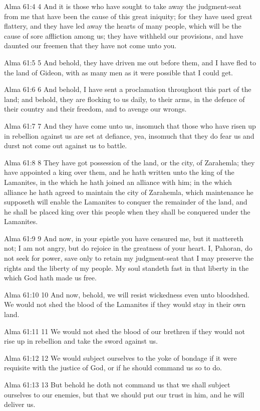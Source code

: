 Alma 61:4
 4 And it is those who have sought to take away the judgment-seat
from me that have been the cause of this great iniquity; for they
have used great flattery, and they have led away the hearts of
many people, which will be the cause of sore affliction among us;
they have withheld our provisions, and have daunted our freemen
that they have not come unto you.

Alma 61:5
 5 And behold, they have driven me out before them, and I have
fled to the land of Gideon, with as many men as it were possible
that I could get.

Alma 61:6
 6 And behold, I have sent a proclamation throughout this part of
the land; and behold, they are flocking to us daily, to their
arms, in the defence of their country and their freedom, and to
avenge our wrongs.

Alma 61:7
 7 And they have come unto us, insomuch that those who have risen
up in rebellion against us are set at defiance, yea, insomuch
that they do fear us and durst not come out against us to battle.

Alma 61:8
 8 They have got possession of the land, or the city, of
Zarahemla; they have appointed a king over them, and he hath
written unto the king of the Lamanites, in the which he hath
joined an alliance with him; in the which alliance he hath agreed
to maintain the city of Zarahemla, which maintenance he supposeth
will enable the Lamanites to conquer the remainder of the land,
and he shall be placed king over this people when they shall be
conquered under the Lamanites.

Alma 61:9
 9 And now, in your epistle you have censured me, but it
mattereth not; I am not angry, but do rejoice in the greatness of
your heart. I, Pahoran, do not seek for power, save only to
retain my judgment-seat that I may preserve the rights and the
liberty of my people. My soul standeth fast in that liberty in
the which God hath made us free.

Alma 61:10
 10 And now, behold, we will resist wickedness even unto
bloodshed. We would not shed the blood of the Lamanites if they
would stay in their own land.

Alma 61:11
 11 We would not shed the blood of our brethren if they would not
rise up in rebellion and take the sword against us.

Alma 61:12
 12 We would subject ourselves to the yoke of bondage if it were
requisite with the justice of God, or if he should command us so
to do.

Alma 61:13
 13 But behold he doth not command us that we shall subject
ourselves to our enemies, but that we should put our trust in
him, and he will deliver us.

